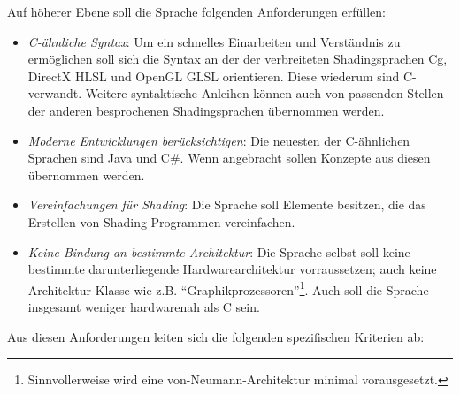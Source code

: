 \documentclass[twoside,a4paper,fleqn,12pt]{article}
\begin{document}
Auf höherer Ebene soll die Sprache folgenden Anforderungen erfüllen:
\begin{itemize}
\item \emph{C-ähnliche Syntax}: Um ein schnelles Einarbeiten und Verständnis zu ermöglichen soll sich die Syntax an der der verbreiteten
Shadingsprachen Cg, DirectX HLSL und OpenGL GLSL orientieren. Diese wiederum sind C-verwandt.
Weitere syntaktische Anleihen können auch von passenden Stellen der anderen besprochenen  Shadingsprachen übernommen werden.
\item \emph{Moderne Entwicklungen berücksichtigen}: Die neuesten der C-ähnlichen Sprachen sind Java und C\#. Wenn angebracht sollen
Konzepte aus diesen übernommen werden.
\item \emph{Vereinfachungen für Shading}: Die Sprache soll Elemente besitzen, die das Erstellen von Shading-Programmen
vereinfachen. \item \emph{Keine Bindung an bestimmte Architektur}: Die Sprache selbst soll keine bestimmte darunterliegende Hardwarearchitektur
vorraussetzen; auch keine Architektur-Klasse wie z.B. "`Graphikprozessoren"'\footnote{Sinnvollerweise wird eine von-Neumann-Architektur minimal vorausgesetzt.}.
Auch soll die Sprache insgesamt weniger hardwarenah als C sein.
\end{itemize}


Aus diesen Anforderungen leiten sich die folgenden spezifischen Kriterien ab:
\end{document}
